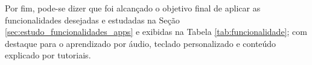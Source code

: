     

Por fim, pode-se dizer que foi alcançado o objetivo final de aplicar as funcionalidades desejadas e estudadas na Seção \ref{sec:estudo_funcionalidades_apps} e exibidas na Tabela \ref{tab:funcionalidade}; com destaque para o aprendizado por áudio, teclado personalizado e conteúdo explicado por tutoriais.